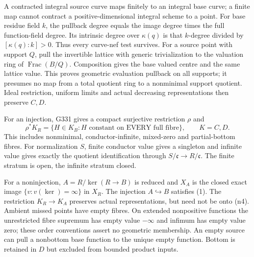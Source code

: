 A contracted integral source curve maps finitely to an integral base curve; a finite map cannot contract a positive-dimensional integral scheme to a point. For base residue field $k$, the pullback degree equals the image degree times the full function-field degree. Its intrinsic degree over $\kappa(q)$ is that $k$-degree divided by $[\kappa(q):k]>0$. Thus every curve-nef test survives. For a source point with support $Q$, pull the invertible lattice with generic trivialization to the valuation ring of $\operatorname{Frac}(B/Q)$. Composition gives the base valued centre and the same lattice value. This proves geometric evaluation pullback on all supports; it presumes no map from a total quotient ring to a nonminimal support quotient. Ideal restriction, uniform limits and actual decreasing representations then preserve $C,D$.

For an injection, G331 gives a compact surjective restriction $\rho$ and
\[
 \rho^*K_R=\{H\in K_B:H\text{ constant on EVERY full fibre}\},\qquad K=C,D. \tag{1}
\]
This includes nonminimal, conductor-infinite, mixed-zero and partial-bottom fibres. For normalization $S$, finite conductor value gives a singleton and infinite value gives exactly the quotient identification through $S/\mathfrak c\to R/\mathfrak c$. The finite stratum is open, the infinite stratum closed.

For a noninjection, $A=R/\ker(R\to B)$ is reduced and $X_A$ is the closed exact image $\{v:v(\ker)=\infty\}$ in $X_R$. The injection $A\hookrightarrow B$ satisfies (1). The restriction $K_R\to K_A$ preserves actual representations, but need not be onto (n4). Ambient missed points have empty fibres. On extended nonpositive functions the unrestricted fibre supremum has empty value $-\infty$ and infimum has empty value zero; these order conventions assert no geometric membership. An empty source can pull a nonbottom base function to the unique empty function. Bottom is retained in $D$ but excluded from bounded product inputs.
